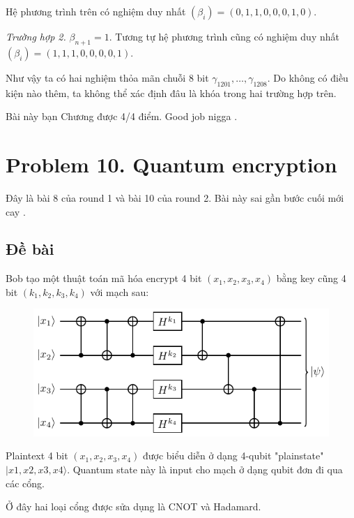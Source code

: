 Hệ phương trình trên có nghiệm duy nhất $(\beta_{i}) = (0, 1, 1, 0, 0, 0, 1, 0)$.

\textit{Trường hợp 2.} $\beta_{n+1} = 1$. Tương tự hệ phương trình cũng có nghiệm duy nhất $(\beta_i) = (1, 1, 1, 0, 0, 0, 0, 1)$.

Như vậy ta có hai nghiệm thỏa mãn chuỗi 8 bit $\gamma_{1201}, \ldots, \gamma_{1208}$. Do không có điều kiện nào thêm, ta không thể xác định đâu là khóa trong hai trường hợp trên.

Bài này bạn Chương được 4/4 điểm. Good job nigga .

\section*{Problem 10. Quantum encryption}

Đây là bài 8 của round 1 và bài 10 của round 2. Bài này sai gần bước cuối mới cay .

\subsection*{Đề bài}

Bob tạo một thuật toán mã hóa encrypt 4 bit $(x_1, x_2, x_3, x_4)$ bằng key cũng 4 bit $(k_1, k_2, k_3, k_4)$ với mạch sau:

\begin{figure}[ht]
    \centering
    \includegraphics[page=1]{nsucrypto/problem10_figures.pdf}
\end{figure}

Plaintext 4 bit $(x_1, x_2, x_3, x_4)$ được biểu diễn ở dạng 4-qubit "plainstate" $\lvert x1, x2, x3, x4 \rangle$. Quantum state này là input cho mạch ở dạng qubit đơn đi qua các cổng.

Ở đây hai loại cổng được sửa dụng là CNOT và Hadamard.


